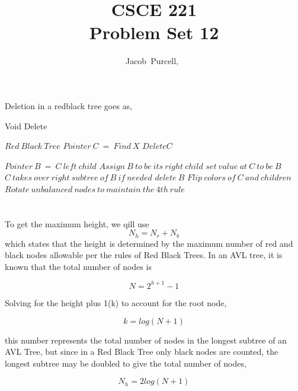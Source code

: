 \documentclass[journal]{IEEEtran}
\begin{document}
\title{CSCE 221 \\ Problem Set 12}

\author{Jacob~Purcell,~}

\maketitle
\section{}

Deletion in a redblack tree goes as,

\begin{algorithm}
    \caption{Void Delete}
    \begin{algorithmic}
        \REQUIRE $Red~Black~Tree$
        \STATE $Pointer~C~=~Find~X$
        \STATE $Delete C$
        \ENDIF


        \STATE $Pointer~B~=~C~left~child$
        \STATE $Assign~B~to~be~its~right~child$
        \ENDWHILE
        \STATE $set~value~at~C~to~be~B$
        \STATE $C~takes~over~right~subtree~of~B~if~needed$
        \STATE $delete~B$
        \STATE $Flip~colors~of~C~and~children$
        \STATE $Rotate~unbalanced~nodes~to~maintain~the~4th~rule$
        
    \end{algorithmic}
\end{algorithm}

\section{}
To get the maximum height, we qill use
$$N_h = N_r + N_b$$
which states that the height is determined by the maximum number of red and black nodes allowable per the rules of Red Black Trees.
In an AVL tree, it is known that the total number of nodes is 

$$N = 2^{h+1}-1$$

Solving for the height plus 1(k) to account for the root node,

$$k = log(N+1)$$

this number represents the total number of nodes in the longest subtree of an AVL Tree, 
but since in a Red Black Tree only black nodes are counted, the longest subtree may be doubled to give the total number of nodes,

$$N_h = \boxed{2log(N+1)}$$
\end{document}
